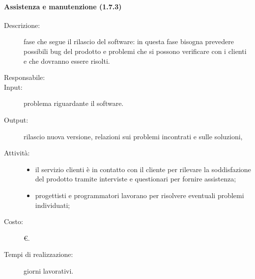 \paragraph{Assistenza e manutenzione (1.7.3)}
\begin{description}
\item[Descrizione:] fase che segue il rilascio del software: in questa fase bisogna prevedere
possibili bug del prodotto e problemi che si possono verificare con i clienti e che dovranno essere risolti.
\item[Responsabile:] 
\item[Input:] problema riguardante il software.
\item[Output:] rilascio nuova versione, relazioni sui problemi incontrati e sulle soluzioni,
\item[Attività:]
\begin{itemize}
\item il servizio clienti è in contatto con il cliente per rilevare la
soddisfazione del prodotto tramite interviste e questionari per fornire assistenza;
\item progettisti e programmatori lavorano per risolvere eventuali problemi individuati;
\end{itemize}
\item[Costo:] \euro{}.
\item[Tempi di realizzazione:]  giorni lavorativi.
\end{description}

